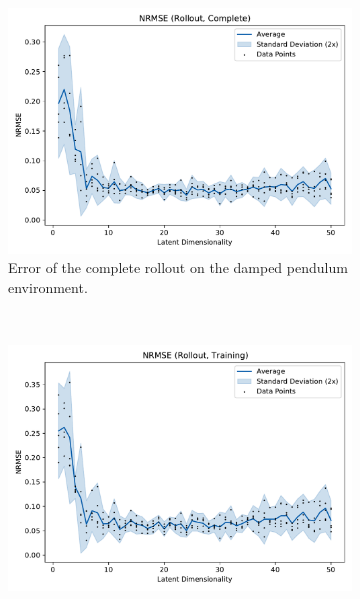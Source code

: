 			\begin{figure}
				\centering
				\begin{subfigure}{0.7\linewidth}
					\centering
					\includegraphics[width=\linewidth]{figures/results/pendulum-damped/latent-dim/comparison-rmse-rollout-normalized-mean-vs-latent-dim.pdf}
					\caption[Error of the complete rollout on the damped pendulum environment]{Error of the complete rollout on the damped pendulum environment.}
					\label{fig:pendulumDampedRmseComplete}
				\end{subfigure} \\
				\begin{subfigure}{0.5\linewidth}
					\centering
					\includegraphics[width=\linewidth]{figures/results/pendulum-damped/latent-dim/comparison-rmse-rollout-train-normalized-mean-vs-latent-dim.pdf}

\end{subfigure}
\end{figure}
